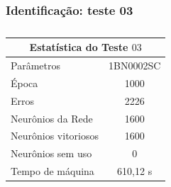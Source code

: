 \documentclass[aspectratio=10]{beamer} %
\begin{document}
\begin{frame}
	\frametitle{Identificação: teste 03}
\begin{table}[H]
	\centering
	\caption{}
	\label{Estatistica do teste $03$}
	\begin{tabular}{@{}lc@{}}
		\toprule
		\multicolumn{2}{c}{Estatística do Teste $03$}         \\ \midrule
		Parâmetros                  & 1BN0002SC \\
		Época                       & 1000       \\
		Erros                       & 2226       \\
		Neurônios da Rede           & 1600       \\
		Neurônios vitoriosos        & 1600       \\
		Neurônios sem uso           & 0         \\
		Tempo de máquina            & 610,12 s   \\ \bottomrule
	\end{tabular}
\end{table} 
\end{frame}
\end{document}
